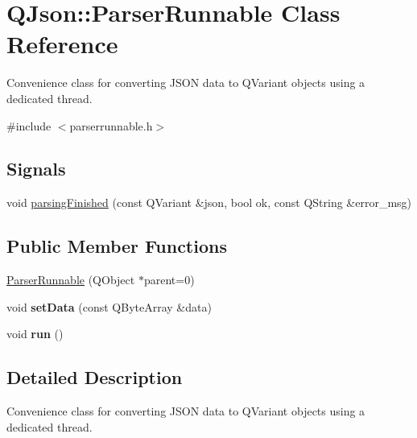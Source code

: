 \hypertarget{class_q_json_1_1_parser_runnable}{
\section{\-Q\-Json\-:\-:\-Parser\-Runnable \-Class \-Reference}
\label{class_q_json_1_1_parser_runnable}
}


\-Convenience class for converting \-J\-S\-O\-N data to \-Q\-Variant objects using a dedicated thread.  




{\ttfamily \#include $<$parserrunnable.\-h$>$}

\subsection*{\-Signals}
\begin{DoxyCompactItemize}
\item 
void \hyperlink{class_q_json_1_1_parser_runnable_ad54987d36a557e0a38e28a41df46afc0}{parsing\-Finished} (const \-Q\-Variant \&json, bool ok, const \-Q\-String \&error\-\_\-msg)
\end{DoxyCompactItemize}
\subsection*{\-Public \-Member \-Functions}
\begin{DoxyCompactItemize}
\item 
\hyperlink{class_q_json_1_1_parser_runnable_ab5e5274e5769134afae6e3e650841192}{\-Parser\-Runnable} (\-Q\-Object $\ast$parent=0)
\item 
\hypertarget{class_q_json_1_1_parser_runnable_afe9e29ba63839152c333d0f23c22e8e2}{
void {\bfseries set\-Data} (const \-Q\-Byte\-Array \&data)}
\label{class_q_json_1_1_parser_runnable_afe9e29ba63839152c333d0f23c22e8e2}

\item 
\hypertarget{class_q_json_1_1_parser_runnable_a0d501878ba1584c60f5d1ac823b4f7ac}{
void {\bfseries run} ()}
\label{class_q_json_1_1_parser_runnable_a0d501878ba1584c60f5d1ac823b4f7ac}

\end{DoxyCompactItemize}


\subsection{\-Detailed \-Description}
\-Convenience class for converting \-J\-S\-O\-N data to \-Q\-Variant objects using a dedicated thread. 

